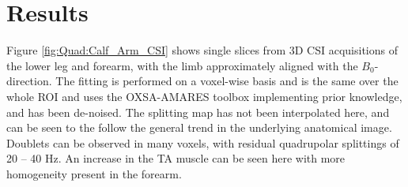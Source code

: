 
\section{Results}

Figure \ref{fig:Quad:Calf_Arm_CSI} shows single slices from 3D \ac{CSI} acquisitions of the lower leg and forearm, with the limb approximately aligned with the $B_0$-direction. The fitting is performed on a voxel-wise basis and is the same over the whole \ac{ROI} and uses the OXSA-AMARES toolbox \cite{Purvis2017OXSA:MATLAB} implementing prior knowledge, and has been de-noised. The splitting map has not been interpolated here, and can be seen to the follow the general trend in the underlying anatomical image. Doublets can be observed in many voxels, with residual quadrupolar splittings of 20 – 40 Hz. An increase in the \ac{TA} muscle can be seen here with more homogeneity present in the forearm.

